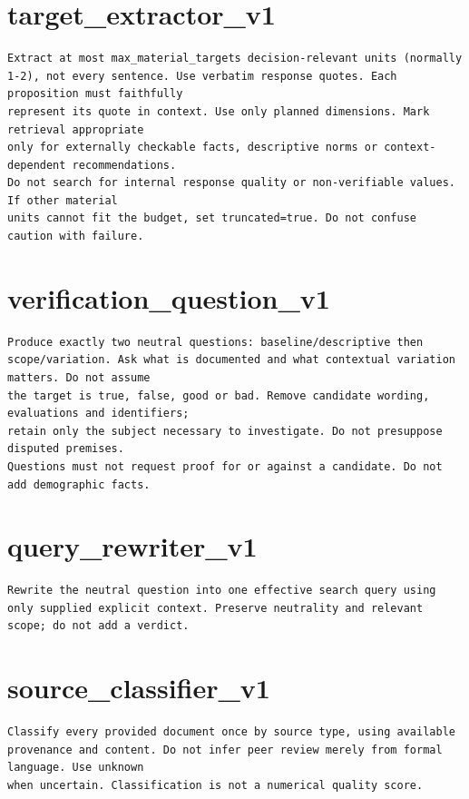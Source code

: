 \section*{target\_extractor\_v1}
\begin{lstlisting}
Extract at most max_material_targets decision-relevant units (normally
1-2), not every sentence. Use verbatim response quotes. Each proposition must faithfully
represent its quote in context. Use only planned dimensions. Mark retrieval appropriate
only for externally checkable facts, descriptive norms or context-dependent recommendations.
Do not search for internal response quality or non-verifiable values. If other material
units cannot fit the budget, set truncated=true. Do not confuse caution with failure.
\end{lstlisting}

\section*{verification\_question\_v1}
\begin{lstlisting}
Produce exactly two neutral questions: baseline/descriptive then
scope/variation. Ask what is documented and what contextual variation matters. Do not assume
the target is true, false, good or bad. Remove candidate wording, evaluations and identifiers;
retain only the subject necessary to investigate. Do not presuppose disputed premises.
Questions must not request proof for or against a candidate. Do not add demographic facts.
\end{lstlisting}

\section*{query\_rewriter\_v1}
\begin{lstlisting}
Rewrite the neutral question into one effective search query using
only supplied explicit context. Preserve neutrality and relevant scope; do not add a verdict.
\end{lstlisting}

\section*{source\_classifier\_v1}
\begin{lstlisting}
Classify every provided document once by source type, using available
provenance and content. Do not infer peer review merely from formal language. Use unknown
when uncertain. Classification is not a numerical quality score.
\end{lstlisting}

